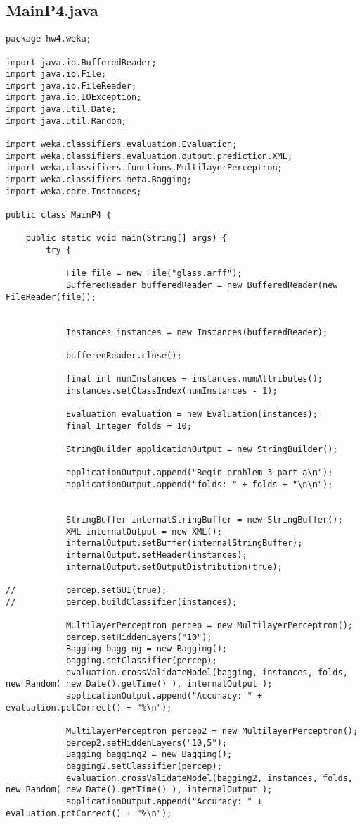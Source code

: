 \subsection{MainP4.java}
\begin{lstlisting}
package hw4.weka;

import java.io.BufferedReader;
import java.io.File;
import java.io.FileReader;
import java.io.IOException;
import java.util.Date;
import java.util.Random;

import weka.classifiers.evaluation.Evaluation;
import weka.classifiers.evaluation.output.prediction.XML;
import weka.classifiers.functions.MultilayerPerceptron;
import weka.classifiers.meta.Bagging;
import weka.core.Instances;

public class MainP4 {

	public static void main(String[] args) {
		try {
			
			File file = new File("glass.arff");
			BufferedReader bufferedReader = new BufferedReader(new FileReader(file));
			
			
			Instances instances = new Instances(bufferedReader);
			
			bufferedReader.close();
			
			final int numInstances = instances.numAttributes();			
			instances.setClassIndex(numInstances - 1);
			
			Evaluation evaluation = new Evaluation(instances);
			final Integer folds = 10;

			StringBuilder applicationOutput = new StringBuilder();

			applicationOutput.append("Begin problem 3 part a\n");
			applicationOutput.append("folds: " + folds + "\n\n");

				
			StringBuffer internalStringBuffer = new StringBuffer();
			XML internalOutput = new XML();
			internalOutput.setBuffer(internalStringBuffer);
			internalOutput.setHeader(instances);
			internalOutput.setOutputDistribution(true);
			
//			percep.setGUI(true);
//			percep.buildClassifier(instances);
			
			MultilayerPerceptron percep = new MultilayerPerceptron();
			percep.setHiddenLayers("10");
			Bagging bagging = new Bagging();
			bagging.setClassifier(percep);
			evaluation.crossValidateModel(bagging, instances, folds, new Random( new Date().getTime() ), internalOutput );
			applicationOutput.append("Accuracy: " + evaluation.pctCorrect() + "%\n");

			MultilayerPerceptron percep2 = new MultilayerPerceptron();
			percep2.setHiddenLayers("10,5");
			Bagging bagging2 = new Bagging();
			bagging2.setClassifier(percep);
			evaluation.crossValidateModel(bagging2, instances, folds, new Random( new Date().getTime() ), internalOutput );
			applicationOutput.append("Accuracy: " + evaluation.pctCorrect() + "%\n");


\end{lstlisting}
